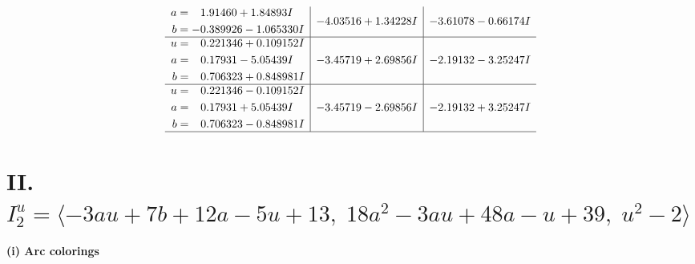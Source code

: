 \documentclass[1p]{elsarticle_modified}
\theoremstyle{definition}
\begin{document}
$$\begin{array}{c|c|c}
\begin{aligned}
a &= \phantom{-}1.91460 + 1.84893 I \\
b &= -0.389926 - 1.065330 I\end{aligned}
 & -4.03516 + 1.34228 I & -3.61078 - 0.66174 I \\ \hline\begin{aligned}
u &= \phantom{-}0.221346 + 0.109152 I \\
a &= \phantom{-}0.17931 - 5.05439 I \\
b &= \phantom{-}0.706323 + 0.848981 I\end{aligned}
 & -3.45719 + 2.69856 I & -2.19132 - 3.25247 I \\ \hline\begin{aligned}
u &= \phantom{-}0.221346 - 0.109152 I \\
a &= \phantom{-}0.17931 + 5.05439 I \\
b &= \phantom{-}0.706323 - 0.848981 I\end{aligned}
 & -3.45719 - 2.69856 I & -2.19132 + 3.25247 I\\
 \hline 
 \end{array}$$\newpage\newpage\renewcommand{\arraystretch}{1}
\centering \section*{II. $I^u_{2}= \langle -3 a u+7 b+12 a-5 u+13,\;18 a^2-3 a u+48 a- u+39,\;u^2-2 \rangle$}
\flushleft \textbf{(i) Arc colorings}\\
\end{document}
